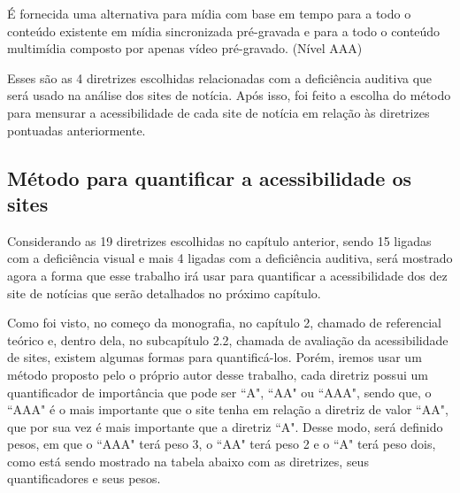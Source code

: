\documentclass[a4paper]{article}
\begin{document}
\begin{titlepage}
É fornecida uma alternativa para mídia com base em tempo para a todo o conteúdo existente em mídia sincronizada pré-gravada e para a todo o conteúdo multimídia composto por apenas vídeo pré-gravado. (Nível AAA)

Esses são as 4 diretrizes escolhidas relacionadas com a deficiência auditiva que será usado na análise dos sites de notícia. Após isso, foi feito a escolha do método para mensurar a acessibilidade de cada site de notícia em relação às diretrizes pontuadas anteriormente.

\subsection{Método para quantificar a acessibilidade os sites}

Considerando as 19 diretrizes escolhidas no capítulo anterior, sendo 15 ligadas com a deficiência visual e mais 4 ligadas com a deficiência auditiva, será mostrado agora a forma que esse trabalho irá usar para quantificar a acessibilidade dos dez site de notícias que serão detalhados no próximo capítulo.

Como foi visto, no começo da monografia, no capítulo 2, chamado de referencial teórico e, dentro dela, no subcapítulo 2.2, chamada de avaliação da acessibilidade de sites, existem algumas formas para quantificá-los. Porém, iremos usar um método proposto pelo o próprio autor desse trabalho, cada diretriz possui um quantificador de importância que pode ser ``A", ``AA" ou ``AAA", sendo que, o ``AAA" é o mais importante que o site tenha em relação a diretriz de valor ``AA", que por sua vez é mais importante que a diretriz ``A". Desse modo, será definido pesos, em que o ``AAA" terá peso 3, o ``AA" terá peso 2 e o ``A" terá peso dois, como está sendo mostrado na tabela abaixo com as diretrizes, seus quantificadores e seus pesos.\\


\end{titlepage}
\end{document}
